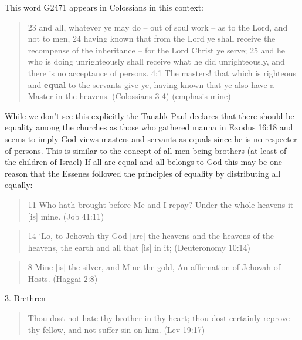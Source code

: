 \documentclass[11pt]{article}
\begin{document}
This word G2471 appears in Colossians in this context:
\begin{quote}
23 and all, whatever ye may do -- out of soul work -- as to the Lord, and not to men,
24 having known that from the Lord ye shall receive the recompense of the inheritance -- for the Lord Christ ye serve;
25 and he who is doing unrighteously shall receive what he did unrighteously, and there is no acceptance of persons.
4:1 The masters! that which is righteous and \textbf{equal} to the servants give ye, having known that ye also have a Master in the heavens.
(Colossians 3-4) (emphasis mine)
\end{quote} 
While we don't see this explicitly the Tanahk Paul declares that there should be equality among the churches as those who gathered manna in Exodus 16:18 and seems to imply God views masters and servants as equals since he is no respecter of persons. This is similar to the concept of all men being brothers (at least of the children of Israel) If all are equal and all belongs to God this may be one reason that the Essenes followed the principles of equality by distributing all equally:
\begin{quote}
11 Who hath brought before Me and I repay? Under the whole heavens it [is] mine. (Job 41:11)
\end{quote}
\begin{quote}
14 `Lo, to Jehovah thy God [are] the heavens and the heavens of the heavens, the earth and all that [is] in it; (Deuteronomy 10:14)
\end{quote}
\begin{quote}
8 Mine [is] the silver, and Mine the gold, An affirmation of Jehovah of Hosts.
(Haggai 2:8)
\end{quote}


3. Brethren
\begin{quote}
Thou dost not hate thy brother in thy heart; thou dost certainly reprove thy fellow, and not suffer sin on him. (Lev 19:17)
\end{quote}
\end{document}
